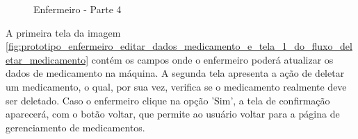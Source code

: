 \begin{figure}[H]
    \centering
\end{figure} 

\begin{figure}[H]
    \centering
    \caption{Enfermeiro - Parte 4}
\end{figure}

A primeira tela da imagem \ref{fig:prototipo_enfermeiro_editar_dados_medicamento_e_tela_1_do_fluxo_deletar_medicamento} contém os campos onde o enfermeiro poderá atualizar os dados de medicamento na máquina. A segunda tela apresenta a ação de deletar um medicamento, o qual, por sua vez, verifica se o medicamento realmente deve ser deletado. Caso o enfermeiro clique na opção 'Sim', a tela de confirmação aparecerá, com o botão voltar, que permite ao usuário voltar para a página de gerenciamento de medicamentos.

